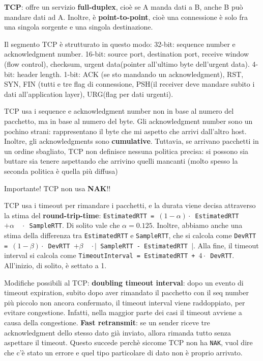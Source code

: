 \documentclass[a4paper,10pt]{article} %
\renewcommand{\b}[1]{%
    {\textbf{#1}}}
\renewcommand{\t}[1]{%
    {\texttt{#1}}}
\begin{document}
\b{TCP}: offre un servizio \b{full-duplex}, cioè se A manda dati a B, anche B può mandare dati ad A. Inoltre, è \b{point-to-point}, cioè una connessione è solo fra una singola sorgente e una singola destinazione.

Il segmento TCP è strutturato in questo modo: 32-bit: sequence number e acknowledgment number. 16-bit: source port, destination port, receive window (flow control), checksum, urgent data(pointer all'ultimo byte dell'urgent data). 4-bit: header length. 1-bit: ACK (se sto mandando un acknowledgment), RST, SYN, FIN (tutti e tre flag di connessione, PSH(il receiver deve mandare subito i dati all'application layer), URG(flag per dati urgenti).

TCP usa i sequence e acknowledgment number non in base al numero del pacchetto, ma in base al numero del byte. Gli acknowledgment number sono un pochino strani: rappresentano il byte che mi aspetto che arrivi dall'altro host. Inoltre, gli acknowledgments sono \b{cumulative}. Tuttavia, se arrivano pacchetti in un ordine sbagliato, TCP non definisce nessuna politica precisa: si possono sia buttare sia tenere aspettando che arrivino quelli mancanti (molto spesso la seconda politica è quella più diffusa)

Importante! TCP non usa \b{NAK}!!

TCP usa i timeout per rimandare i pacchetti, e la durata viene decisa attraverso la stima del \b{round-trip-time}: \t{EstimatedRTT = $(1 - \alpha) \cdot $ EstimatedRTT $ + \alpha \quad \cdot $ SampleRTT}. Di solito vale che $\alpha = 0.125$. Inoltre, abbiamo anche una stima della differenza tra \t{EstimatedRTT} e \t{SampleRTT}, che si calcola come \t{DevRTT = $(1 - \beta) \cdot $ DevRTT $ + \beta \quad \cdot | $ SampleRTT - EstimatedRTT $ | $}. Alla fine, il timeout interval si calcola come \t{TimeoutInterval = EstimatedRTT + $4 \cdot $ DevRTT}. All'inizio, di solito, è settato a 1.

Modifiche possibili al TCP: \b{doubling timeout interval}: dopo un evento di timeout expiration, subito dopo aver rimandato il pacchetto con il seq number più piccolo non ancora confermato, il timeout interval viene raddoppiato, per evitare congestione. Infatti, nella maggior parte dei casi il timeout avviene a causa della congestione. \b{Fast retransmit}: se un sender riceve tre acknowledgment dello stesso dato già inviato, allora rimanda tutto senza aspettare il timeout. Questo succede perchè siccome TCP non ha \t{NAK}, vuol dire che c'è stato un errore e quel tipo particolare di dato non è proprio arrivato.
\end{document}
